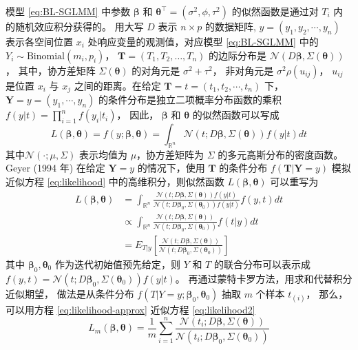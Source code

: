 \documentclass[12pt,a4paper,UTF8,twoside]{book}
\theoremstyle{definition}
\theoremstyle{definition}
\theoremstyle{definition}
\theoremstyle{remark}
\begin{document}
模型 \eqref{eq:BL-SGLMM} 中参数 \(\boldsymbol{\beta}\) 和
\(\boldsymbol{\theta}^{\top} = (\sigma^2,\phi,\tau^2)\)
的似然函数是通过对 \(T_i\) 内的随机效应积分获得的。 用大写 \(D\) 表示
\(n\times p\) 的数据矩阵, \(y = (y_1, y_2,\cdots, y_n)\) 表示各空间位置
\(x_i\) 处响应变量的观测值，对应模型 \eqref{eq:BL-SGLMM} 中的
\(Y_i \sim \mathrm{Binomial}(m_i,p_i)\)，
\(\mathbf{T} = (T_1,T_2,\ldots,T_n)\) 的边际分布是
\(\mathcal{N}(D\boldsymbol{\beta}, \Sigma(\boldsymbol{\theta}))\)，
其中，协方差矩阵 \(\Sigma(\boldsymbol{\theta})\) 的对角元是
\(\sigma^2+\tau^2\)， 非对角元是 \(\sigma^2\rho(u_{ij})\)， \(u_{ij}\)
是位置 \(x_i\) 与 \(x_j\) 之间的距离。在给定
\(\mathbf{T} = t = (t_1,t_2,\cdots,t_n)\) 下，
\(\mathbf{Y} = y =(y_1,\cdots,y_n)\)
的条件分布是独立二项概率分布函数的乘积
\(f(y|t)=\prod_{i=1}^{n}f(y_{i}|t_{i})\)， 因此， \(\boldsymbol{\beta}\)
和 \(\boldsymbol{\theta}\) 的似然函数可以写成 \begin{equation}
L(\boldsymbol{\beta},\boldsymbol{\theta}) = f(y;\boldsymbol{\beta},\boldsymbol{\theta}) = \int_{\mathbb{R}^{n}}\mathcal{N}(t;D\boldsymbol{\beta},\Sigma(\boldsymbol{\theta}))f(y|t)dt \label{eq:likelihood}
\end{equation} \noindent 其中\(\mathcal{N}(\cdot;\mu,\Sigma)\)
表示均值为 \(\mu\)，协方差矩阵为 \(\Sigma\)
的多元高斯分布的密度函数。Geyer (1994 年)\citep{Geyer1994On} 在给定
\(\mathbf{Y}=y\) 的情况下，使用 \(\mathbf{T}\) 的条件分布
\(f(\mathbf{T}|\mathbf{Y}=y)\) 模拟近似方程 \eqref{eq:likelihood}
中的高维积分，则似然函数 \(L(\boldsymbol{\beta},\boldsymbol{\theta})\)
可以重写为 \begin{equation}
\begin{aligned}
L(\boldsymbol{\beta},\boldsymbol{\theta})
& = \int_{\mathbb{R}^{n}} \frac{\mathcal{N}(t;D\boldsymbol{\beta},\Sigma(\boldsymbol{\theta}))f(y|t)}{\mathcal{N}(t;D\boldsymbol{\beta}_{0},\Sigma(\boldsymbol{\theta}_{0}))f(y|t)}f(y,t)dt \\
& \varpropto \int_{\mathbb{R}^{n}} \frac{\mathcal{N}(t;D\boldsymbol{\beta}, \Sigma(\boldsymbol{\theta}))}{\mathcal{N}(t;D\boldsymbol{\beta}_{0}, \Sigma(\boldsymbol{\theta}_{0}))}f(t|y)dt \\
&= E_{T|y}\left[\frac{\mathcal{N}(t; D\boldsymbol{\beta}, \Sigma(\boldsymbol{\theta}))}{\mathcal{N}(t; D\boldsymbol{\beta}_{0}, \Sigma(\boldsymbol{\theta}_{0}))}\right] 
\end{aligned} \label{eq:likelihood2}
\end{equation} \noindent 其中
\(\boldsymbol{\beta}_{0},\boldsymbol{\theta}_{0}\)
作为迭代初始值预先给定，则 \(Y\) 和 \(T\) 的联合分布可以表示成
\(f(y,t) = \mathcal{N}(t; D\boldsymbol{\beta}_{0}, \Sigma(\boldsymbol{\theta}_{0})) f(y|t)\)。
再通过蒙特卡罗方法，用求和代替积分近似期望， 做法是从条件分布
\(f(T|Y=y; \boldsymbol{\beta}_0, \boldsymbol{\theta}_0)\) 抽取 \(m\)
个样本 \(t_{(i)}\)， 那么，可以用方程 \eqref{eq:likelihood-approx}
近似方程 \eqref{eq:likelihood2} \begin{equation}
L_{m}(\boldsymbol{\beta},\boldsymbol{\theta})=\frac{1}{m}\sum_{i=1}^{n}\frac{\mathcal{N}(t_{i};D\boldsymbol{\beta},\Sigma(\boldsymbol{\theta}))}{\mathcal{N}(t_{i};D\boldsymbol{\beta}_{0},\Sigma(\boldsymbol{\theta}_{0}))} \label{eq:likelihood-approx}
\end{equation}
\end{document}
